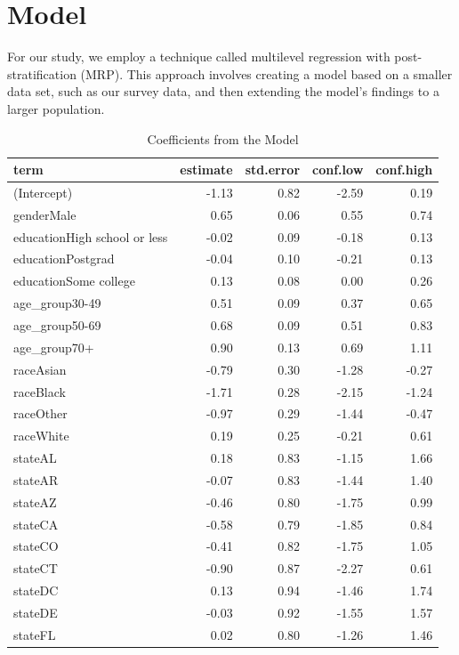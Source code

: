 \documentclass[
  letterpaper,
  DIV=11,
  numbers=noendperiod]{scrartcl}
\begin{document}
\hypertarget{model}{%
\section{Model}\label{model}}

For our study, we employ a technique called multilevel regression with
post-stratification (MRP). This approach involves creating a model based
on a smaller data set, such as our survey data, and then extending the
model's findings to a larger population.

\begin{longtable}[t]{lrrrr}
\caption{Coefficients from the Model}\\
\toprule
term & estimate & std.error & conf.low & conf.high\\
\midrule
(Intercept) & -1.13 & 0.82 & -2.59 & 0.19\\
genderMale & 0.65 & 0.06 & 0.55 & 0.74\\
educationHigh school or less & -0.02 & 0.09 & -0.18 & 0.13\\
educationPostgrad & -0.04 & 0.10 & -0.21 & 0.13\\
educationSome college & 0.13 & 0.08 & 0.00 & 0.26\\
\addlinespace
age\_group30-49 & 0.51 & 0.09 & 0.37 & 0.65\\
age\_group50-69 & 0.68 & 0.09 & 0.51 & 0.83\\
age\_group70+ & 0.90 & 0.13 & 0.69 & 1.11\\
raceAsian & -0.79 & 0.30 & -1.28 & -0.27\\
raceBlack & -1.71 & 0.28 & -2.15 & -1.24\\
\addlinespace
raceOther & -0.97 & 0.29 & -1.44 & -0.47\\
raceWhite & 0.19 & 0.25 & -0.21 & 0.61\\
stateAL & 0.18 & 0.83 & -1.15 & 1.66\\
stateAR & -0.07 & 0.83 & -1.44 & 1.40\\
stateAZ & -0.46 & 0.80 & -1.75 & 0.99\\
\addlinespace
stateCA & -0.58 & 0.79 & -1.85 & 0.84\\
stateCO & -0.41 & 0.82 & -1.75 & 1.05\\
stateCT & -0.90 & 0.87 & -2.27 & 0.61\\
stateDC & 0.13 & 0.94 & -1.46 & 1.74\\
stateDE & -0.03 & 0.92 & -1.55 & 1.57\\
\addlinespace
stateFL & 0.02 & 0.80 & -1.26 & 1.46\\

\end{longtable}
\end{document}
